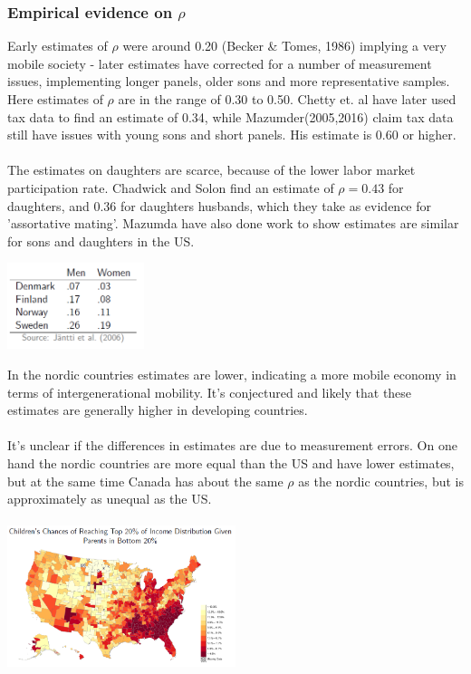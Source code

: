 \documentclass[12pt, a4paper]{article}
\begin{document}
\begin{multicols}{2}
\subsubsection{Empirical evidence on $\rho$}
Early estimates of $\rho$ were around 0.20 (Becker \& Tomes, 1986) implying a very mobile society - later estimates have corrected for a number of measurement issues, implementing longer panels, older sons and more representative samples. Here estimates of $\rho$ are in the range of 0.30 to 0.50. Chetty et. al have later used tax data to find an estimate of 0.34, while Mazumder(2005,2016) claim tax data still have issues with young sons and short panels. His estimate is 0.60 or higher. 
\\ \\
The estimates on daughters are scarce, because of the lower labor market participation rate. Chadwick and Solon find an estimate of $\rho = 0.43$ for daughters, and 0.36 for daughters husbands, which they take as evidence for 'assortative mating'. Mazumda have also done work to show estimates are similar for sons and daughters in the US. 
\begin{center}
\includegraphics[width = 0.3\textwidth]{rho.PNG}
\end{center}
In the nordic countries estimates are lower, indicating a more mobile economy in terms of intergenerational mobility. It's conjectured and likely that these estimates are generally higher in developing countries. 
\\ \\
It's unclear if the differences in estimates are due to measurement errors. On one hand the nordic countries are more equal than the US and have lower estimates, but at the same time Canada has about the same $\rho$ as the nordic countries, but is approximately as unequal as the US. 
\\ \\
\includegraphics[width = 0.5\textwidth]{map.PNG}


\end{multicols}
\end{document}
